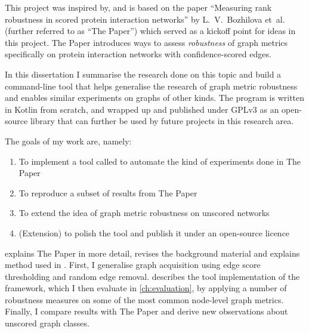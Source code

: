 This project was inspired by, and is based on the paper ``Measuring rank robustness in scored protein interaction networks'' by L.~V.~Bozhilova et~al.~\cite{Bozhilova2019} (further referred to as ``The Paper'') which served as a kickoff point for ideas in this project.
The Paper introduces ways to assess \textsl{robustness} of graph metrics specifically on protein interaction networks with confidence-scored edges.

In this dissertation I summarise the research done on this topic and build a command-line tool \graffs that helps generalise the research of graph metric robustness and enables similar experiments on graphs of other kinds.
The program is written in Kotlin from scratch, and wrapped up and published under GPLv3 as an open-source library that can further be used by future projects in this research area.

The goals of my work are, namely:
\begin{enumerate}[noitemsep,topsep=5pt]
    \item To implement a tool called \graffs to automate the kind of experiments done in The Paper
    \item To reproduce a subset of results from The Paper
    \item To extend the idea of graph metric robustness on unscored networks
    \item (Extension) to polish the tool and publish it under an open-source licence
\end{enumerate}

 explains The Paper in more detail, revises the background material and explains method used in \graffs.
First, I generalise graph acquisition using edge score thresholding and random edge removal.
 describes the tool implementation of the framework, which I then evaluate in \cref{ch:evaluation}, by applying a number of robustness measures on some of the most common node-level graph metrics.
Finally, I compare results with The Paper and derive new observations about unscored graph classes.
